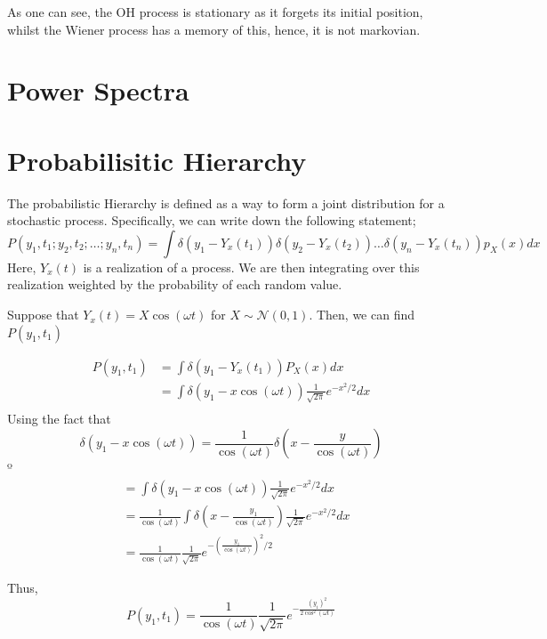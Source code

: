 As one can see, the OH process is stationary as it forgets its initial position, whilst the Wiener process has a memory of this, hence, it is not markovian.

\section{Power Spectra}
\section{Probabilisitic Hierarchy}

The probabilistic Hierarchy is defined as a way to form a joint distribution for a stochastic process. Specifically, we can write down the following statement;
\begin{equation}
	P(y_1, t_1 ; y_2, t_2; \dots ; y_n, t_n) = \int \delta(y_1 - Y_x(t_1)) \delta(y_2 - Y_x(t_2)) \dots \delta(y_n - Y_x(t_n))p_X(x) dx
\end{equation}
Here, $Y_x(t)$ is a realization of a process. We are then integrating over this realization weighted by the probability of each random value. 

\begin{example}
	Suppose that $Y_x(t) = X \cos(\omega t)$ for $X\sim \mathcal{N}(0,1)$. Then, we can find $P(y_1, t_1)$

	\begin{align*}
		P(y_1, t_1) &= \int \delta(y_1 - Y_x(t_1)) P_X(x) dx\\
		&= \int \delta(y_1 - x\cos(\omega t)) \frac{1}{\sqrt{2\pi}}e^{-x^2/2} dx \\
	\end{align*}
	Using the fact that \[\delta(y_1 - x\cos(\omega t)) = \frac{1}{\cos(\omega t)} \delta(x-\frac{y}{\cos(\omega t)})\]º
	\begin{align*}
		&= \int \delta(y_1 - x\cos(\omega t)) \frac{1}{\sqrt{2\pi}}e^{-x^2/2} dx \\
		&=\frac{1}{\cos(\omega t)} \int \delta(x-\frac{y_1}{\cos(\omega t)})  \frac{1}{\sqrt{2\pi}}e^{-x^2/2} dx \\
		&= \frac{1}{\cos(\omega t)}  \frac{1}{\sqrt{2\pi}}e^{-\left(\frac{y_1}{\cos(\omega t)}\right)^2/2} 
	\end{align*}

	Thus, 
	\begin{equation}
		\boxed{
	P(y_1, t_1) = \frac{1}{\cos(\omega t)}  \frac{1}{\sqrt{2\pi}}e^{-\frac{\left(y_1\right)^2}{2\cos^2(\omega t)}} }
	\end{equation}
\end{example}

